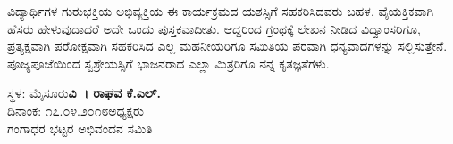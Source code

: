 {ವಿದ್ಯಾರ್ಥಿಗಳ ಗುರುಭಕ್ತಿಯ ಅಭಿವ್ಯಕ್ತಿಯ ಈ ಕಾರ್ಯಕ್ರಮದ ಯಶಸ್ಸಿಗೆ ಸಹಕರಿಸಿ\-ದವರು ಬಹಳ. ವೈಯಕ್ತಿಕವಾಗಿ ಹೆಸರು ಹೇಳುವುದಾದರೆ ಅದೇ ಒಂದು ಪುಸ್ತಕವಾದೀತು. ಆದ್ದರಿಂದ ಗ್ರಂಥಕ್ಕೆ ಲೇಖನ ನೀಡಿದ ವಿದ್ವಾಂಸರಿಗೂ, ಪ್ರತ್ಯಕ್ಷವಾಗಿ ಪರೋಕ್ಷ\-ವಾಗಿ ಸಹಕರಿಸಿದ ಎಲ್ಲ ಮಹನೀಯರಿಗೂ ಸಮಿತಿಯ ಪರವಾಗಿ ಧನ್ಯವಾದಗಳನ್ನು ಸಲ್ಲಿಸುತ್ತೇನೆ. ಪೂಜ್ಯಪೂಜೆಯಿಂದ ಸ್ವಶ್ರೇಯಸ್ಸಿಗೆ ಭಾಜನರಾದ ಎಲ್ಲಾ ಮಿತ್ರರಿಗೂ ನನ್ನ ಕೃತಜ್ಞತೆಗಳು.
\bigskip

\noindent ಸ್ಥಳ: ಮೈಸೂರು\hfill				           \textbf{ವಿ~। ರಾಘವ ಕೆ.ಎಲ್.}\\
ದಿನಾಂಕ: ೧೭.೦೪.೨೦೧೮\hfill  						    ಅಧ್ಯಕ್ಷರು\\
\phantom{i}\hfill ಗಂಗಾಧರ ಭಟ್ಟರ ಅಭಿವಂದನ ಸಮಿತಿ


\articleend
}
